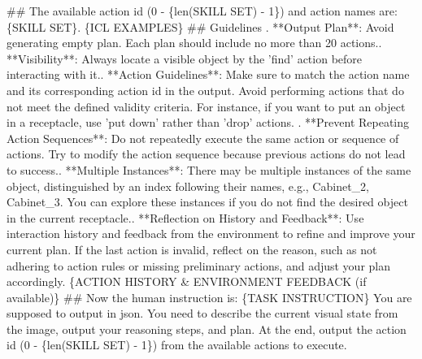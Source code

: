 \begin{tcolorbox}[colback=gray!5!white, colframe=gray!75!black, 
title=Prompt for EB-ALFRED, boxrule=0.3mm, width=\textwidth, arc=3mm, auto outer arc=true]
\#\# The available action id (0 - \{len(SKILL SET) - 1\}) and action names are: \{SKILL SET\}.
\newline
\newline
\{ICL EXAMPLES\}
\newline
\newline
\#\# Guidelines
. **Output Plan**: Avoid generating empty plan. Each plan should include no more than 20 actions.. **Visibility**: Always locate a visible object by the 'find' action before interacting with it.. **Action Guidelines**: Make sure to match the action name and its corresponding action id in the output.
\newline
Avoid performing actions that do not meet the defined validity criteria. For instance, if you want to put an object in a receptacle, use 'put down' rather than 'drop' actions. . **Prevent Repeating Action Sequences**: Do not repeatedly execute the same action or sequence of actions.
\newline
Try to modify the action sequence because previous actions do not lead to success.. **Multiple Instances**: There may be multiple instances of the same object, distinguished by an index following their names, e.g., Cabinet\_2, Cabinet\_3. You can explore these instances if you do not find the desired object in the current receptacle.. **Reflection on History and Feedback**: Use interaction history and feedback from the environment to refine and improve your current plan.
\newline
If the last action is invalid, reflect on the reason, such as not adhering to action rules or missing preliminary actions, and adjust your plan accordingly.
\newline
\newline
\{ACTION HISTORY \& ENVIRONMENT FEEDBACK (if available)\}
\newline
\newline
\#\# Now the human instruction is: \{TASK INSTRUCTION\} You are supposed to output in json. You need to describe the current visual state from the image, output your reasoning steps, and plan. At the end, output the action id (0 - \{len(SKILL SET) - 1\}) from the available actions to execute.
\end{tcolorbox}

